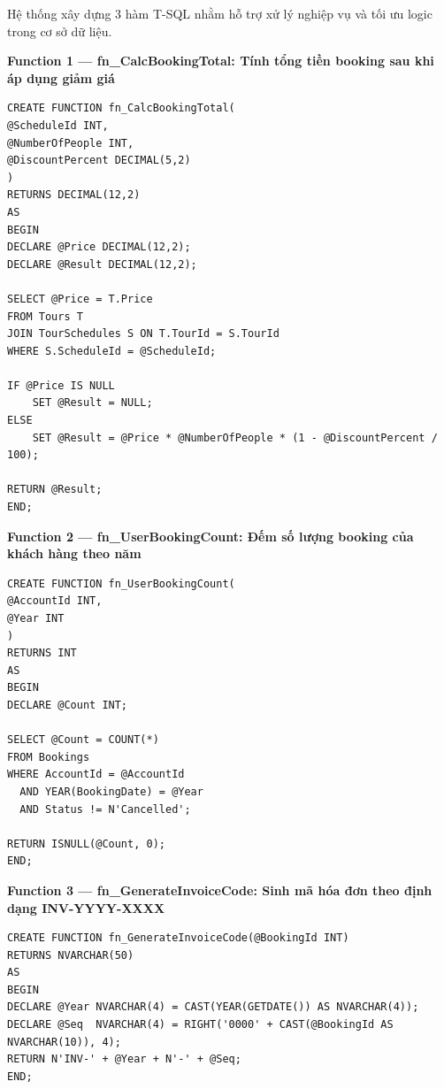 Hệ thống xây dựng 3 hàm T-SQL nhằm hỗ trợ xử lý nghiệp vụ và tối ưu logic trong cơ sở dữ liệu.

\noindent\textbf{Function 1 — fn\_CalcBookingTotal: Tính tổng tiền booking sau khi áp dụng giảm giá}

\begin{lstlisting}[style=sql, caption={fn\_CalcBookingTotal}]
CREATE FUNCTION fn_CalcBookingTotal(
@ScheduleId INT,
@NumberOfPeople INT,
@DiscountPercent DECIMAL(5,2)
)
RETURNS DECIMAL(12,2)
AS
BEGIN
DECLARE @Price DECIMAL(12,2);
DECLARE @Result DECIMAL(12,2);

SELECT @Price = T.Price
FROM Tours T
JOIN TourSchedules S ON T.TourId = S.TourId
WHERE S.ScheduleId = @ScheduleId;

IF @Price IS NULL
    SET @Result = NULL;
ELSE
    SET @Result = @Price * @NumberOfPeople * (1 - @DiscountPercent / 100);

RETURN @Result;
END;
\end{lstlisting}

\noindent\textbf{Function 2 — fn\_UserBookingCount: Đếm số lượng booking của khách hàng theo năm}

\begin{lstlisting}[style=sql, caption={fn\_UserBookingCount}]
CREATE FUNCTION fn_UserBookingCount(
@AccountId INT,
@Year INT
)
RETURNS INT
AS
BEGIN
DECLARE @Count INT;

SELECT @Count = COUNT(*)
FROM Bookings
WHERE AccountId = @AccountId
  AND YEAR(BookingDate) = @Year
  AND Status != N'Cancelled';

RETURN ISNULL(@Count, 0);
END;
\end{lstlisting}

\noindent\textbf{Function 3 — fn\_GenerateInvoiceCode: Sinh mã hóa đơn theo định dạng INV-YYYY-XXXX}

\begin{lstlisting}[style=sql, caption={fn\_GenerateInvoiceCode}]
CREATE FUNCTION fn_GenerateInvoiceCode(@BookingId INT)
RETURNS NVARCHAR(50)
AS
BEGIN
DECLARE @Year NVARCHAR(4) = CAST(YEAR(GETDATE()) AS NVARCHAR(4));
DECLARE @Seq  NVARCHAR(4) = RIGHT('0000' + CAST(@BookingId AS NVARCHAR(10)), 4);
RETURN N'INV-' + @Year + N'-' + @Seq;
END;
\end{lstlisting}

